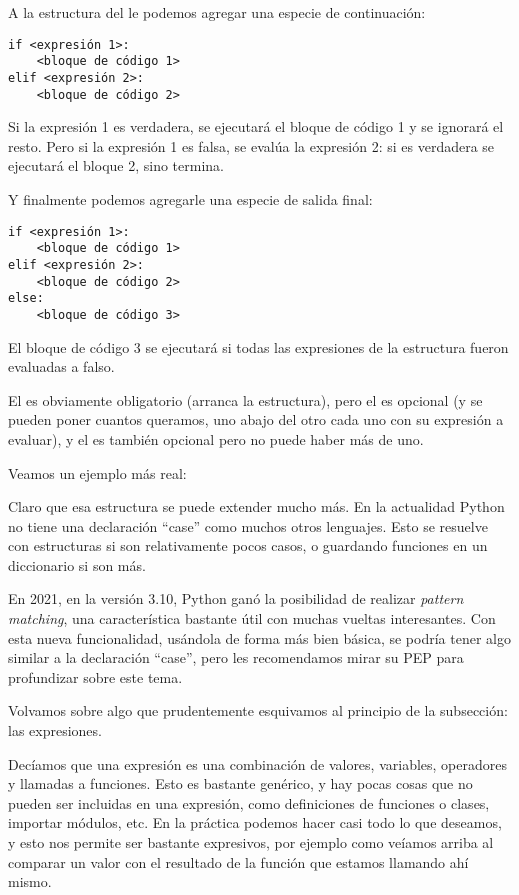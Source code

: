 A la estructura del  le podemos agregar una especie de continuación:

\begin{verbatim}
if <expresión 1>:
    <bloque de código 1>
elif <expresión 2>:
    <bloque de código 2>
\end{verbatim}

Si la expresión 1 es verdadera, se ejecutará el bloque de código 1 y se ignorará el resto. Pero si la expresión 1 es falsa, se evalúa la expresión 2: si es verdadera se ejecutará el bloque 2, sino termina.

Y finalmente podemos agregarle una especie de salida final:

\begin{verbatim}
if <expresión 1>:
    <bloque de código 1>
elif <expresión 2>:
    <bloque de código 2>
else:
    <bloque de código 3>
\end{verbatim}

El bloque de código 3 se ejecutará si todas las expresiones de la estructura fueron evaluadas a falso.

El  es obviamente obligatorio (arranca la estructura), pero el  es opcional (y se pueden poner cuantos queramos, uno abajo del otro cada uno con su expresión a evaluar), y el  es también opcional pero no puede haber más de uno.

Veamos un ejemplo más real:


Claro que esa estructura se puede extender mucho más. En la actualidad Python no tiene una declaración ``case'' como muchos otros lenguajes. Esto se resuelve con estructuras  si son relativamente pocos casos, o guardando funciones en un diccionario si son más.

En 2021, en la versión 3.10, Python ganó la posibilidad de realizar \emph{pattern matching}, una característica bastante útil con muchas vueltas interesantes. Con esta nueva funcionalidad, usándola de forma más bien básica, se podría tener algo similar a la declaración ``case'', pero les recomendamos mirar su PEP \cite{pep-0622} para profundizar sobre este tema.

Volvamos sobre algo que prudentemente esquivamos al principio de la subsección: las expresiones.

Decíamos que una expresión es una combinación de valores, variables, operadores y llamadas a funciones. Esto es bastante genérico, y hay pocas cosas que no pueden ser incluidas en una expresión, como definiciones de funciones o clases, importar módulos, etc. En la práctica podemos hacer casi todo lo que deseamos, y esto nos permite ser bastante expresivos, por ejemplo como veíamos arriba al comparar un valor con el resultado de la función  que estamos llamando ahí mismo.

